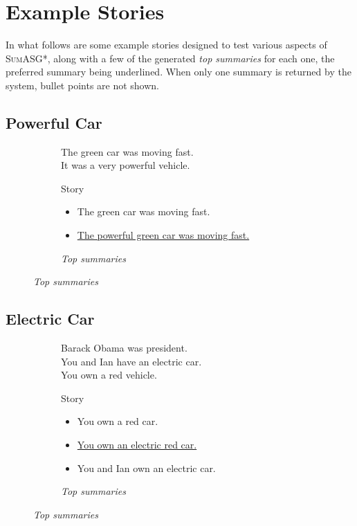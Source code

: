 \chapter{Example Stories}
\label{appendix:stories}

In what follows are some example stories designed to test various aspects of \textsc{SumASG*}, along with a few of the generated \textit{top summaries} for each one, the preferred summary being underlined. When only one summary is returned by the system, bullet points are not shown.

\section{Powerful Car}

\begin{figure}[H]
\begin{subfigure}{0.45\textwidth}
\begin{displayquote}
The green car was moving fast.\\
It was a very powerful vehicle.
\end{displayquote}
\caption{Story}
\end{subfigure}
\begin{subfigure}{0.55\textwidth}
\begin{itemize}[nolistsep]
\item The green car was moving fast.
\item \underline{The powerful green car was moving fast.}
\end{itemize}
\vspace{\topsep}
\caption{\textit{Top summaries}}
\end{subfigure}
\end{figure}

\section{Electric Car}

\begin{figure}[H]
\begin{subfigure}{0.52\textwidth}
\begin{displayquote}
Barack Obama was president.\\
You and Ian have an electric car.\\
You own a red vehicle.
\end{displayquote}
\caption{Story}
\end{subfigure}
\begin{subfigure}{0.48\textwidth}
\begin{itemize}[nolistsep]
\item You own a red car.
\item \ul{You own an electric red car.}
\item You and Ian own an electric car.
\end{itemize}
\vspace{\topsep}
\caption{\textit{Top summaries}}
\end{subfigure}
\end{figure}

